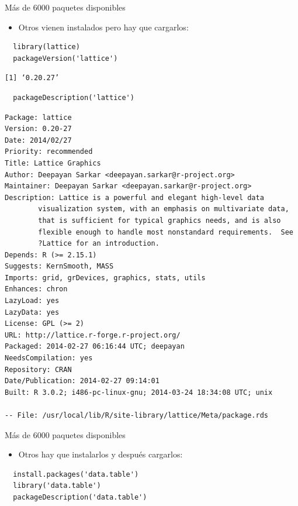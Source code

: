 \documentclass[xcolor={usenames,svgnames,dvipsnames}]{beamer}
\begin{document}
\begin{frame}[fragile,label=sec-1-3-4]{Más de 6000 paquetes disponibles}
 \begin{itemize}
\item Otros vienen instalados pero hay que cargarlos:
\end{itemize}
\lstset{language=R,label= ,caption= ,numbers=none}
\begin{lstlisting}
  library(lattice)
  packageVersion('lattice')
\end{lstlisting}

\begin{verbatim}
[1] ‘0.20.27’
\end{verbatim}

\lstset{language=R,label= ,caption= ,numbers=none}
\begin{lstlisting}
  packageDescription('lattice')
\end{lstlisting}

\begin{verbatim}
Package: lattice
Version: 0.20-27
Date: 2014/02/27
Priority: recommended
Title: Lattice Graphics
Author: Deepayan Sarkar <deepayan.sarkar@r-project.org>
Maintainer: Deepayan Sarkar <deepayan.sarkar@r-project.org>
Description: Lattice is a powerful and elegant high-level data
        visualization system, with an emphasis on multivariate data,
        that is sufficient for typical graphics needs, and is also
        flexible enough to handle most nonstandard requirements.  See
        ?Lattice for an introduction.
Depends: R (>= 2.15.1)
Suggests: KernSmooth, MASS
Imports: grid, grDevices, graphics, stats, utils
Enhances: chron
LazyLoad: yes
LazyData: yes
License: GPL (>= 2)
URL: http://lattice.r-forge.r-project.org/
Packaged: 2014-02-27 06:16:44 UTC; deepayan
NeedsCompilation: yes
Repository: CRAN
Date/Publication: 2014-02-27 09:14:01
Built: R 3.0.2; i486-pc-linux-gnu; 2014-03-24 18:34:08 UTC; unix

-- File: /usr/local/lib/R/site-library/lattice/Meta/package.rds
\end{verbatim}
\end{frame}

\begin{frame}[fragile,label=sec-1-3-5]{Más de 6000 paquetes disponibles}
 \begin{itemize}
\item Otros hay que instalarlos y después cargarlos:
\end{itemize}
\lstset{language=R,label= ,caption= ,numbers=none}
\begin{lstlisting}
  install.packages('data.table')
  library('data.table')
  packageDescription('data.table')
\end{lstlisting}
\end{frame}
\end{document}
